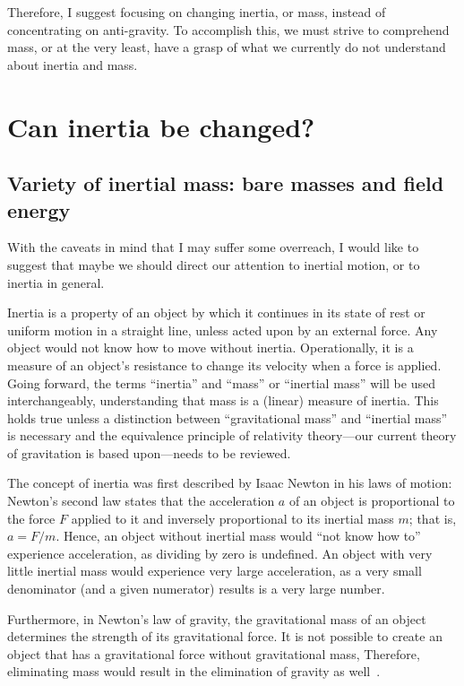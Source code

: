 Therefore, I suggest focusing on changing inertia, or mass, instead of concentrating on anti-gravity. To accomplish this, we must strive to comprehend mass, or at the very least, have a grasp of what we currently do not understand about inertia and mass.


\section{Can inertia be changed?}
\label{2023-UFO-part-Perception-flight-characteristics-ci}


\subsection{Variety of inertial mass: bare masses and field energy}

With the caveats in mind that I may suffer some overreach, I would like to suggest that
maybe we should direct our attention to inertial motion, or to inertia in general.

Inertia is a property of an object by which it continues in its state of rest or uniform motion in a straight line,
unless acted upon by an external force. Any object would not know how to move without inertia. Operationally, it is a measure of an object's resistance to change its velocity when a force is applied. Going forward, the terms ``inertia'' and ``mass'' or ``inertial mass'' will be used interchangeably, understanding that mass is a
(linear) measure of inertia. This holds true unless a distinction between ``gravitational mass'' and ``inertial mass'' is necessary
and the equivalence principle of relativity theory---our current theory of gravitation is based upon---needs to be reviewed.


The concept of inertia was first described by Isaac Newton in his laws of motion:
Newton's second law states that the acceleration $a$ of an object is proportional to the force $F$
applied to it and inversely proportional to its inertial mass $m$; that is, $a = F / m$.
Hence, an object without inertial mass would ``not know how to'' experience acceleration, as dividing by zero is undefined.
An object with very little inertial mass would experience very large acceleration, as a very small denominator (and a
given  numerator) results is a very large number.

Furthermore, in Newton's law of gravity, the gravitational mass of an object determines the strength of its gravitational force.
It is not possible to create an object that has a gravitational force without gravitational mass,
Therefore, eliminating mass would result in the elimination of gravity as well~\cite{Wilczek2003}.

